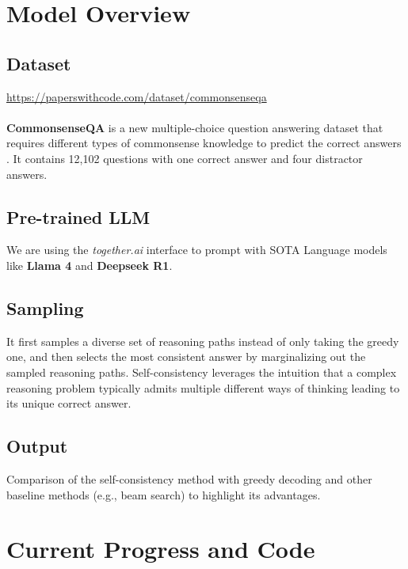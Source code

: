 \documentclass[24pt]{article}
\begin{document}
\section{Model Overview}
\subsection{Dataset}
\url{https://paperswithcode.com/dataset/commonsenseqa}\\ \\
\textbf{CommonsenseQA} is a new multiple-choice question answering dataset that requires different types of commonsense knowledge to predict the correct answers . It contains 12,102 questions with one correct answer and four distractor answers.

\subsection{Pre-trained LLM}
We are using the \textit{together.ai} interface to prompt with SOTA Language models like \textbf{Llama 4} and \textbf{Deepseek R1}. 

\subsection{Sampling}
It first samples a diverse set of reasoning paths instead of only taking the greedy one, and then selects the most consistent answer by marginalizing out the sampled reasoning paths. Self-consistency leverages the intuition that a complex reasoning problem typically admits multiple different ways of thinking leading to its unique correct answer.


\subsection{Output} Comparison of the self-consistency method with greedy decoding and other baseline methods (e.g., beam search) to highlight its advantages.


\section{Current Progress and Code}
\end{document}
